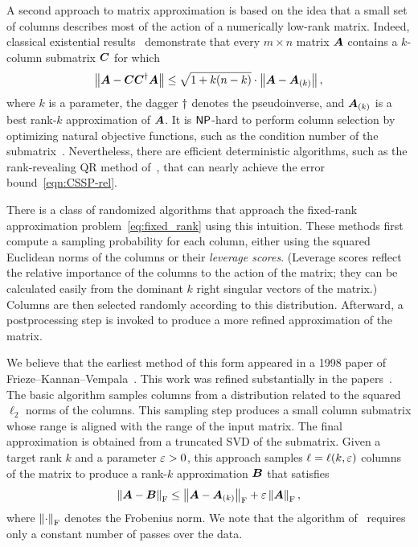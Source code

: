 \documentclass[final]{siamltex}
\newcounter{algorithm}[section]
\newcommand{\pgnotate}[1]{{\color{blue}[#1]}}
\begin{document}
A second approach to matrix approximation is based on the idea that
a small set of columns describes most of the action of a numerically
low-rank matrix. Indeed, classical existential
results~\cite{Rus64:Auerbachs-Theorem} demonstrate that every $m
\times n$ matrix $\bm{A}$ contains a $k$-column submatrix $\bm{C}$
for which
\begin{equation} \label{eqn:CSSP-rel}
\norm{ \mtx{A} - \mtx{CC}^\psinv \mtx{A} }
    \leq \sqrt{1 + k(n-k)} \cdot \norm{ \mtx{A} - \mtx{A}_{(k)} },
\end{equation}
where $k$ is a parameter, the dagger $\dagger$ denotes the pseudoinverse,
and $\bm{A}_{(k)}$ is a best rank-$k$ approximation of $\bm{A}$.
It is ${\sf NP}$-hard
to perform column selection by optimizing natural objective functions,
such as the condition number of the submatrix~\cite{CM09:Selecting-Maximum}.  Nevertheless, there are
efficient deterministic algorithms, such as the rank-revealing QR method of~\cite{gu_rrqr},
that can nearly achieve the error bound~\eqref{eqn:CSSP-rel}.

There is a class of randomized algorithms that approach the
fixed-rank approximation problem~\eqref{eq:fixed_rank} using this intuition.
These methods first
compute a sampling probability for each column, either using the squared
Euclidean norms of the columns or their \emph{leverage scores}.
(Leverage scores reflect the relative importance of the columns to the
action of the matrix; they can be calculated easily from the dominant $k$
right singular vectors of the matrix.)  Columns are then selected randomly
according to this distribution.  Afterward, a postprocessing step is invoked
to produce a more refined approximation of the matrix.

We believe that the earliest method of this form appeared in a 1998 paper of
Frieze--Kannan--Vempala~\cite{FKV98:Fast-Monte-Carlo,kannan_vempala}.
This work was refined substantially in the
papers~\cite{DFKVV99:Clustering-Large,DFKVV04:Clustering-Large,drineas_kannan_mahoney}.
The basic algorithm samples columns from a distribution related to the
squared $\ell_2$ norms of the columns.  This sampling step produces a
small column submatrix whose range is aligned with the range of the
input matrix. The final approximation is obtained from a truncated
SVD of the submatrix. Given a target rank $k$ and a parameter $\varepsilon
> 0$, this approach samples $\ell = \ell(k,\varepsilon)$ columns of the
matrix to produce a rank-$k$ approximation $\bm{B}$ that
satisfies
\begin{equation} \label{eqn:CSSP-abs}
\fnorm{ \mtx{A} - \mtx{B} } \leq \fnorm{ \mtx{A} - \mtx{A}_{(k)} } + \eps \fnorm{\mtx{A}},
\end{equation}
where $\left\Vert {\cdot} \right\Vert_{\mathrm{F}}$ denotes the Frobenius norm.
We note that the algorithm of~\cite{drineas_kannan_mahoney}
requires only a constant number of passes over the data.
\end{document}
